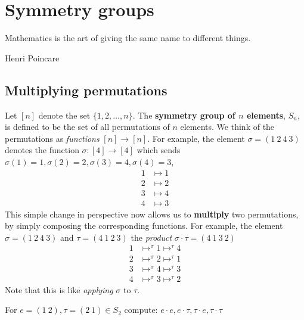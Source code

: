 \section{Symmetry groups}

\epigraph{Mathematics is the art of giving the same name to different things.}{Henri Poincare}





\subsection{Multiplying permutations}
Let $ [n]$ denote the set $ \{1, 2, \ldots, n \} $. The \textbf{symmetry group of $ n$ elements}, $ S_n$, is defined to be the set of all permutations of $ n$ elements. We think of the permutations as \emph{functions} $ [n] \rightarrow [n]$.  For example, the element $ \sigma = (1 \: 2 \: 4 \: 3)$ denotes the function $ \sigma: [4] \rightarrow [4]$ which sends $ \sigma(1) = 1, \sigma(2) = 2, \sigma(3) = 4, \sigma(4) = 3$,
  \begin{align*}
    1 & \mapsto 1 \\
    2 & \mapsto 2 \\
    3 & \mapsto 4 \\
    4 & \mapsto 3 
  \end{align*}
This simple change in perspective now allows us to \textbf{multiply} two permutations, by simply composing the corresponding functions. For example, the element $ \sigma = (1 \: 2 \: 4 \: 3)$ and $ \tau = (4 \: 1 \: 2 \: 3)$ the \emph{product} $ \sigma \cdot \tau = (4 \: 1 \: 3 \: 2)$ 
  \begin{align*}
    1 & \mapsto^\sigma 1  \mapsto^\tau 4 \\
    2 & \mapsto^\sigma 2  \mapsto^\tau 1 \\
    3 & \mapsto^\sigma 4  \mapsto^\tau 3 \\
    4 & \mapsto^\sigma 3  \mapsto^\tau 2
  \end{align*}
Note that this is like \emph{applying} $ \sigma$ to $ \tau$.

\begin{questions}
  \item For $ e = (1 \: 2), \tau = (2 \: 1) \in S_2$ compute: $ e \cdot e, e \cdot \tau, \tau \cdot e, \tau \cdot \tau$
\end{questions}

